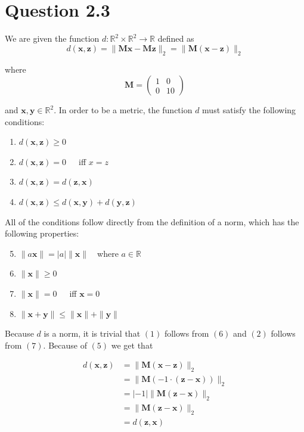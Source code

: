 \documentclass[11pt,a4paper]{article}
\begin{document}
\section{Question 2.3}
We are given the function $d : \mathbb{R}^2 \times \mathbb{R}^2 \rightarrow \mathbb{R}$ defined as
$$d(\bm{x},\bm{z}) = \| \bm{Mx} - \bm{Mz} \|_{2} = \| \bm{M}(\bm{x} - \bm{z}) \|_{2}$$

where
$$\bm{M} = \begin{pmatrix} 1 & 0 \\ 0 & 10 \end{pmatrix}$$

and $\bm{x},\bm{y} \in \mathbb{R}^2$. In order to be a metric, the function $d$ must satisfy the following conditions:

\begin{enumerate}
    \item $d(\bm{x},\bm{z}) \geq 0$
    \item $d(\bm{x},\bm{z}) = 0$\ \ \ iff $x = z$
    \item $d(\bm{x},\bm{z}) = d(\bm{z},\bm{x})$
    \item $d(\bm{x},\bm{z}) \leq d(\bm{x},\bm{y}) + d(\bm{y},\bm{z})$
\end{enumerate}

All of the conditions follow directly from the definition of a norm, which has the
following properties:

\begin{enumerate}
    \setcounter{enumi}{4}
    \item $\| a\bm{x}\| = |a|\| \bm{x} \|$\ \ where $a \in \mathbb{R}$
    \item $\| \bm{x} \| \geq 0$
    \item $\| \bm{x} \| = 0$\ \ \ iff $\bm{x} = 0$
    \item $\| \bm{x} + \bm{y} \| \leq \| \bm{x} \| + \| \bm{y} \|$
\end{enumerate}

Because $d$ is a norm, it is trivial that $(1)$ follows from $(6)$ and $(2)$ follows from $(7)$. Because of $(5)$ we get that 

\begin{align*}
    d(\bm{x}, \bm{z}) &= \| \bm{M}(\bm{x} - \bm{z}) \|_{2} \\
                      &= \| \bm{M}(-1\cdot(\bm{z} - \bm{x})) \|_{2} \\
                      &= |-1|\| \bm{M}(\bm{z} - \bm{x}) \|_{2} \tag{per 5}\\
                      &= \| \bm{M}(\bm{z} - \bm{x}) \|_{2} \\
                      &= d(\bm{z},\bm{x})
\end{align*}
\end{document}
